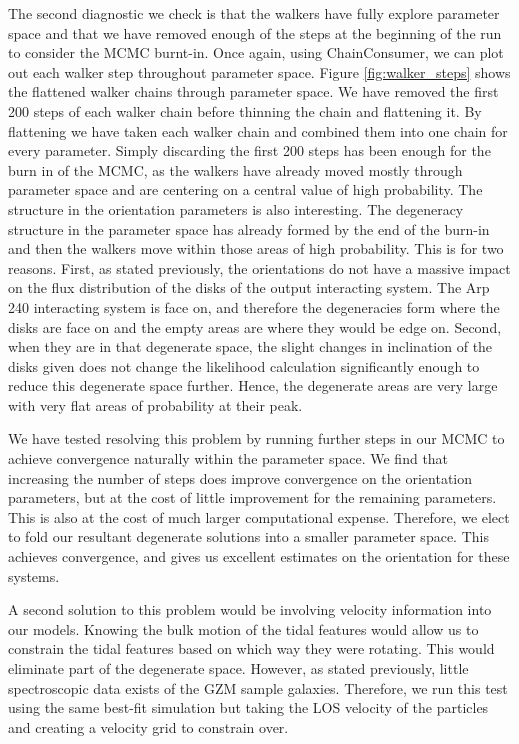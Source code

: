 The second diagnostic we check is that the walkers have fully explore parameter space and that we have removed enough of the steps at the beginning of the run to consider the MCMC burnt-in. Once again, using ChainConsumer, we can plot out each walker step throughout parameter space. Figure \ref{fig:walker_steps} shows the flattened walker chains through parameter space. We have removed the first 200 steps of each walker chain before thinning the chain and flattening it. By flattening we have taken each walker chain and combined them into one chain for every parameter. Simply discarding the first 200 steps has been enough for the burn in of the MCMC, as the walkers have already moved mostly through parameter space and are centering on a central value of high probability. The structure in the orientation parameters is also interesting. The degeneracy structure in the parameter space has already formed by the end of the burn-in and then the walkers move within those areas of high probability. This is for two reasons. First, as stated previously, the orientations do not have a massive impact on the flux distribution of the disks of the output interacting system. The Arp 240 interacting system is face on, and therefore the degeneracies form where the disks are face on and the empty areas are where they would be edge on. Second, when they are in that degenerate space, the slight changes in inclination of the disks given does not change the likelihood calculation significantly enough to reduce this degenerate space further. Hence, the degenerate areas are very large with very flat areas of probability at their peak.

We have tested resolving this problem by running further steps in our MCMC to achieve convergence naturally within the parameter space. We find that increasing the number of steps does improve convergence on the orientation parameters, but at the cost of little improvement for the remaining parameters. This is also at the cost of much larger computational expense. Therefore, we elect to fold our resultant degenerate solutions into a smaller parameter space. This achieves convergence, and gives us excellent estimates on the orientation for these systems.

A second solution to this problem would be involving velocity information into our models. Knowing the bulk motion of the tidal features would allow us to constrain the tidal features based on which way they were rotating. This would eliminate part of the degenerate space. However, as stated previously, little spectroscopic data exists of the GZM sample galaxies. Therefore, we run this test using the same best-fit simulation but taking the LOS velocity of the particles and creating a velocity grid to constrain over.


